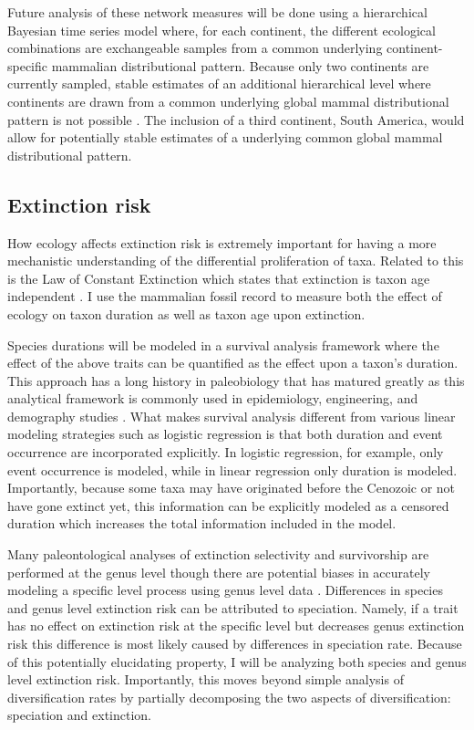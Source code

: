 \documentclass[11pt,letterpaper]{article}
\begin{document}
Future analysis of these network measures will be done using a hierarchical Bayesian time series model where, for each continent, the different ecological combinations are exchangeable samples from a common underlying continent-specific mammalian distributional pattern. Because only two continents are currently sampled, stable estimates of an additional hierarchical level where continents are drawn from a common underlying global mammal distributional pattern is not possible \citep{Gelman2013d}. The inclusion of a third continent, South America, would allow for potentially stable estimates of a underlying common global mammal distributional pattern. %

\subsection{Extinction risk}
How ecology affects extinction risk is extremely important for having a more mechanistic understanding of the differential proliferation of taxa. Related to this is the Law of Constant Extinction which states that extinction is taxon age independent \citep{VanValen1973}. I use the mammalian fossil record to measure both the effect of ecology on taxon duration as well as taxon age upon extinction. 

Species durations will be modeled in a survival analysis framework where the effect of the above traits can be quantified as the effect upon a taxon's duration. This approach has a long history in paleobiology \citep{Simpson1944,Simpson1953,VanValen1973,VanValen1979,Baumiller1993,Foote1988} that has matured greatly as this analytical framework is commonly used in epidemiology, engineering, and demography studies \citep{Kleinbaum2005}. What makes survival analysis different from various linear modeling strategies such as logistic regression is that both duration and event occurrence are incorporated explicitly. In logistic regression, for example, only event occurrence is modeled, while in linear regression only duration is modeled. Importantly, because some taxa may have originated before the Cenozoic or not have gone extinct yet, this information can be explicitly modeled as a censored duration which increases the total information included in the model. 

Many paleontological analyses of extinction selectivity and survivorship are performed at the genus level \citep{Tomiya2013,Liow2008,Harnik2013,Finnegan2008,Foote2006} though there are potential biases in accurately modeling a specific level process using genus level data \citep{Raup1975,Sepkoski1975,Simpson2006,Raup1991a,VanValen1979}. Differences in species and genus level extinction risk can be attributed to speciation. Namely, if a trait has no effect on extinction risk at the specific level but decreases genus extinction risk this difference is most likely caused by differences in speciation rate. Because of this potentially elucidating property, I will be analyzing both species and genus level extinction risk. Importantly, this moves beyond simple analysis of diversification rates by partially decomposing the two aspects of diversification: speciation and extinction.
\end{document}
